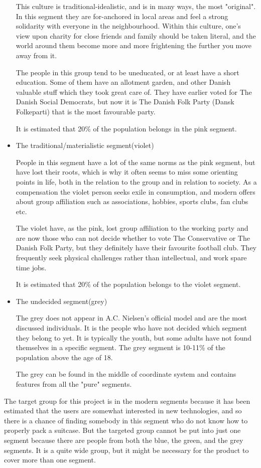 \begin{itemize}
This culture is traditional-idealistic, and is in many ways, the most "original". In this segment they are for-anchored in local areas and feel a strong solidarity with everyone in the neighbourhood. Within this culture, one's view upon charity for close friends and family should be taken literal, and the world around them become more and more frightening the further you move away from it.

The people in this group tend to be uneducated, or at least have a short education. Some of them have an allotment garden, and other Danish valuable stuff which they took great care of. They have earlier voted for The Danish Social Democrats, but now it is The Danish Folk Party (Dansk Folkeparti) that is the most favourable party.

It is estimated that 20\% of the population belongs in the pink segment.

\item The traditional/materialistic segment(violet)

People in this segment have a lot of the same norms as the pink segment, but have lost their roots, which is why it often seems to miss some orienting points in life, both in the relation to the group and in relation to society. As a compensation the violet person seeks exile in consumption, and modern offers about group affiliation such as associations, hobbies, sports clubs, fan clubs etc. 

The violet have, as the pink, lost group affiliation to the working party and are now those who can not decide whether to vote The Conservative or The Danish Folk Party, but they definitely have their favourite football club. They frequently seek physical challenges rather than intellectual, and work spare time jobs.

It is estimated that 20\% of the population belongs to the violet segment.

\item The undecided segment(grey)

The grey does not appear in A.C. Nielsen's official model and are the most discussed individuals. It is the people who have not decided which segment they belong to yet. It is typically the youth, but some adults have not found themselves in a specific segment. The grey segment is 10-11\% of the population above the age of 18.

The grey can be found in the middle of coordinate system and contains features from all the "pure" segments.
\end{itemize}
\citep{minerva}

The target group for this project is in the modern segments because it has been estimated that the users are somewhat interested in new technologies, and so there is a chance of finding somebody in this segment who do not know how to properly pack a suitcase. But the targeted group cannot be put into just one segment because there are people from both the blue, the green, and the grey segments. It is a quite wide group, but it might be necessary for the product to cover more than one segment.